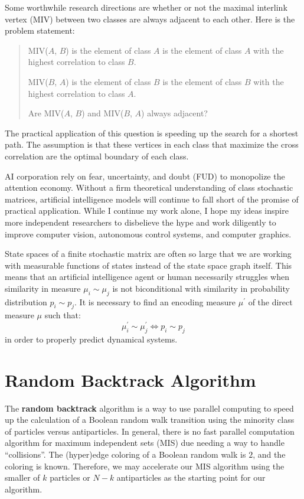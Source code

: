 \documentclass[10pt, a5paper, twoside, openright]{memoir}
\begin{document}
Some worthwhile research directions are whether or not the maximal interlink vertex (MIV) between two classes are always adjacent to each other. Here is the problem statement:
\begin{quote}
MIV($A$, $B$) is the element of class $A$ is the element of class $A$ with the highest correlation to class $B$. 

MIV($B$, $A$) is the element of class $B$ is the element of class $B$ with the highest correlation to class $A$. 

Are MIV($A$, $B$) and MIV($B$, $A$) always adjacent?
\end{quote}
The practical application of this question is speeding up the search for a shortest path. The assumption is that these vertices in each class that maximize the cross correlation are the optimal boundary of each class.

AI corporation rely on fear, uncertainty, and doubt (FUD) to monopolize the attention economy. Without a firm theoretical understanding of class stochastic matrices, artificial intelligence models will continue to fall short of the promise of practical application. While I continue my work alone, I hope my ideas inspire more independent researchers to disbelieve the hype and work diligently to improve computer vision, autonomous control systems, and computer graphics. 

State spaces of a finite stochastic matrix are often so large that we are working with measurable functions of states instead of the state space graph itself. This means that an artificial intelligence agent or human necessarily struggles when similarity in measure $\mu_i \sim \mu_j$ is not biconditional with similarity in probability distribution $p_i \sim p_j$. It is necessary to find an encoding measure $\mu^\prime$ of the direct measure $\mu$ such that:
$$\mu^\prime_i \sim \mu^\prime_j \iff p_i \sim p_j$$
in order to properly predict dynamical systems.


\chapter{Random Backtrack Algorithm}
The \textbf{random backtrack} algorithm is a way to use parallel computing to speed up the calculation of a Boolean random walk transition using the minority class of particles versus antiparticles. In general, there is no fast parallel computation algorithm for maximum independent sets (MIS) due needing a way to handle ``collisions''. The (hyper)edge coloring of a Boolean random walk is $2$, and the coloring is known. Therefore, we may accelerate our MIS algorithm using the smaller of $k$ particles or $N-k$ antiparticles as the starting point for our algorithm.
\end{document}
